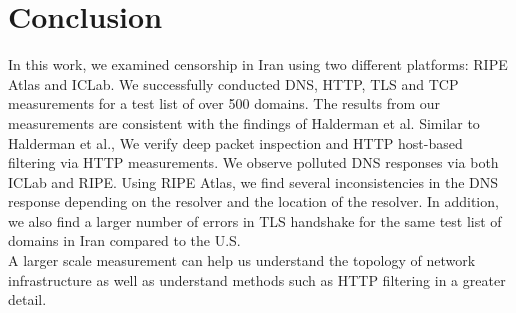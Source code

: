 \section{Conclusion}\label{sec:conclusion}
In this work, we examined censorship in Iran using two different platforms: RIPE Atlas and ICLab. We successfully  conducted DNS, HTTP, TLS and TCP measurements for a test list of over 500 domains. The results from our measurements are consistent with the findings of Halderman et al. Similar to Halderman et al., We verify deep packet inspection and HTTP host-based filtering via HTTP measurements. We observe polluted DNS responses via both ICLab and RIPE. Using RIPE Atlas, we find several inconsistencies in the DNS response depending on the resolver and the location of the resolver. In addition, we also find a larger number of errors in TLS handshake for the same test list of domains in Iran compared to the U.S.\\
A larger scale measurement can help us understand the topology of network infrastructure as well as understand methods such as HTTP filtering in a greater detail.